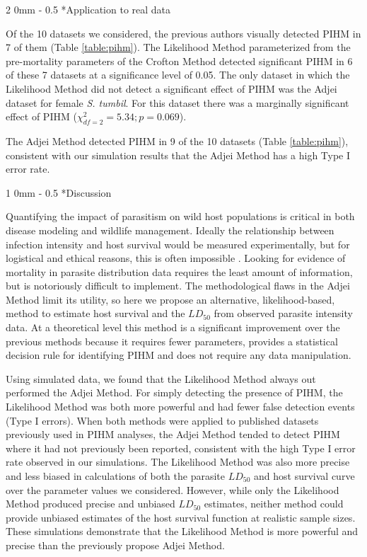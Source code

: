 \documentclass[12pt, a4paper]{article}
\makeatletter
\renewcommand{\section}{\@startsection
{section}%
{1}%
{0mm}%
{-\baselineskip}%
{0.5\baselineskip}%
{\normalfont\bf\large}} %
\renewcommand{\subsection}{\@startsection
{subsection}%
{2}%
{0mm}%
{-\baselineskip}%
{0.5\baselineskip}%
{\normalfont\bf}} %
\makeatother
\begin{document}
\subsection*{Application to real data}

Of the 10 datasets we considered, the previous authors visually detected PIHM
in 7 of them (Table \ref{table:pihm}).  The Likelihood Method parameterized
from the pre-mortality parameters of the Crofton Method detected significant
PIHM in 6 of these 7 datasets at a significance level of 0.05.  The only
dataset in which the Likelihood Method did not detect a significant effect of PIHM was the Adjei dataset
for female \emph{S. tumbil}.  For this dataset there was a marginally significant effect
of PIHM ($\chi^2_{df=2} = 5.34; p = 0.069$).

The Adjei Method detected PIHM in 9 of the 10 datasets (Table \ref{table:pihm}), consistent with our simulation results that the Adjei Method has a high Type I error rate.

\section*{Discussion}


Quantifying the impact of parasitism on wild host populations is critical in
both disease modeling and wildlife management. Ideally the relationship between
infection intensity and host survival would be measured experimentally, but for
logistical and ethical reasons, this is often impossible \citep{McCallum2000a}.
Looking for evidence of mortality in parasite distribution data requires the
least amount of information, but is notoriously difficult to implement. The
methodological flaws in the Adjei Method limit its utility, so here we propose
an alternative, likelihood-based, method to estimate host survival and the
$LD_{50}$ from observed parasite intensity data.  At a theoretical level this
method is a significant improvement over the previous methods because it requires fewer parameters,
provides a statistical decision rule for identifying PIHM and does not require
any data manipulation.

Using simulated data, we found that the Likelihood Method always out performed the Adjei Method. For simply detecting the presence of PIHM, the Likelihood
Method was both more powerful and had fewer false detection events (Type I
errors).  When both methods were applied to published datasets previously used
in PIHM analyses, the Adjei Method tended to detect PIHM where it had not previously been
reported, consistent with the high Type I error rate observed in our
simulations. The Likelihood Method was also more precise and less
biased in calculations of both the parasite $LD_{50}$ and host survival curve over the parameter values we considered.
However, while only the Likelihood Method produced precise and unbiased $LD_{50}$
estimates, neither method could provide unbiased estimates of the host survival
function at realistic sample sizes.  These simulations demonstrate that
the Likelihood Method is more powerful and precise than the previously propose Adjei Method.
\end{document}
